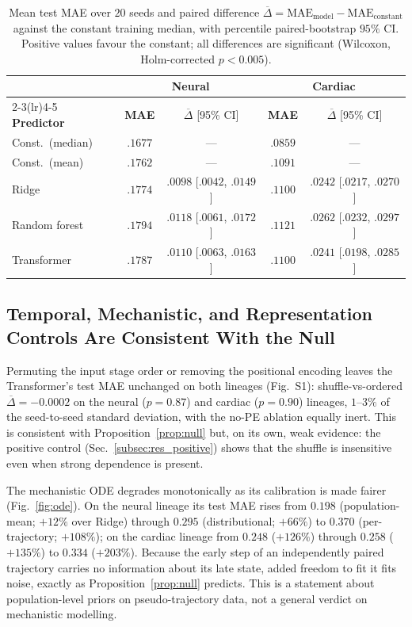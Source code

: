\documentclass[10pt,journal,compsoc]{IEEEtran}
\begin{document}
\begin{table}[!t]
\centering
\caption{Mean test MAE over $20$ seeds and paired difference $\overline{\Delta}=\mathrm{MAE}_{\text{model}}-\mathrm{MAE}_{\text{constant}}$ against the constant training median, with percentile paired-bootstrap $95\%$ CI. Positive values favour the constant; all differences are significant (Wilcoxon, Holm-corrected $p<0.005$).}
\label{tab:constant}
\footnotesize
\setlength{\tabcolsep}{1.8pt}
\begin{tabular}{lcccc}
\toprule
 & \multicolumn{2}{c}{\textbf{Neural}} & \multicolumn{2}{c}{\textbf{Cardiac}} \\
\cmidrule(lr){2-3}\cmidrule(lr){4-5}
\textbf{Predictor} & \textbf{MAE} & $\overline{\Delta}$ [95\% CI] & \textbf{MAE} & $\overline{\Delta}$ [95\% CI] \\
\midrule
Const.\ (median) & $.1677$ & --- & $.0859$ & --- \\
Const.\ (mean) & $.1762$ & --- & $.1091$ & --- \\
Ridge & $.1774$ & $.0098$ [$.0042$, $.0149$] & $.1100$ & $.0242$ [$.0217$, $.0270$] \\
Random forest & $.1794$ & $.0118$ [$.0061$, $.0172$] & $.1121$ & $.0262$ [$.0232$, $.0297$] \\
Transformer & $.1787$ & $.0110$ [$.0063$, $.0163$] & $.1100$ & $.0241$ [$.0198$, $.0285$] \\
\bottomrule
\end{tabular}
\end{table}

\subsection{Temporal, Mechanistic, and Representation Controls Are Consistent With the Null}
\label{subsec:res_temporal}
\label{subsec:res_ode}
\label{subsec:res_sensitivity}

Permuting the input stage order or removing the positional encoding leaves the Transformer's test MAE unchanged on both lineages (Fig.~S1): shuffle-vs-ordered $\overline{\Delta}=-0.0002$ on the neural ($p=0.87$) and cardiac ($p=0.90$) lineages, $1$--$3\%$ of the seed-to-seed standard deviation, with the no-PE ablation equally inert. This is consistent with Proposition~\ref{prop:null} but, on its own, weak evidence: the positive control (Sec.~\ref{subsec:res_positive}) shows that the shuffle is insensitive even when strong dependence is present.

The mechanistic ODE degrades monotonically as its calibration is made fairer (Fig.~\ref{fig:ode}). On the neural lineage its test MAE rises from $0.198$ (population-mean; $+12\%$ over Ridge) through $0.295$ (distributional; $+66\%$) to $0.370$ (per-trajectory; $+108\%$); on the cardiac lineage from $0.248$ ($+126\%$) through $0.258$ ($+135\%$) to $0.334$ ($+203\%$). Because the early step of an independently paired trajectory carries no information about its late state, added freedom to fit it fits noise, exactly as Proposition~\ref{prop:null} predicts. This is a statement about population-level priors on pseudo-trajectory data, not a general verdict on mechanistic modelling.
\end{document}

